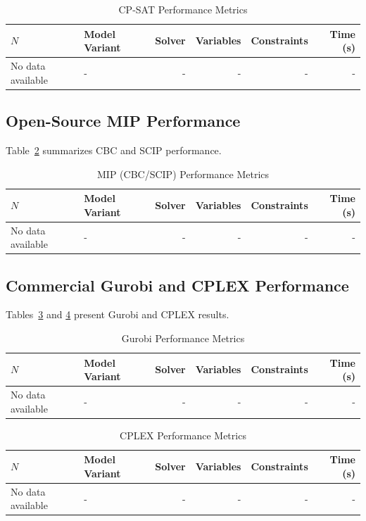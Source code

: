 \documentclass[a4paper,fleqn]{cas-sc}
\begin{document}
\begin{table}[H]
\centering
\caption{CP-SAT Performance Metrics} \label{tab:cpsat}
\begin{tabular}{llrrrr}
\toprule
$N$ & Model Variant & Solver & Variables & Constraints & Time (s) \\
\midrule
No data available & - & - & - & - & - \\
\bottomrule
\end{tabular}
\end{table}

\subsection{Open-Source MIP Performance}
Table~\ref{tab:mip} summarizes CBC and SCIP performance.

\begin{table}[H]
\centering
\caption{MIP (CBC/SCIP) Performance Metrics} \label{tab:mip}
\begin{tabular}{llrrrr}
\toprule
$N$ & Model Variant & Solver & Variables & Constraints & Time (s) \\
\midrule
No data available & - & - & - & - & - \\
\bottomrule
\end{tabular}
\end{table}

\subsection{Commercial Gurobi and CPLEX Performance}
Tables~\ref{tab:gurobi} and \ref{tab:cplex} present Gurobi and CPLEX results.

\begin{table}[H]
\centering
\caption{Gurobi Performance Metrics} \label{tab:gurobi}
\begin{tabular}{llrrrr}
\toprule
$N$ & Model Variant & Solver & Variables & Constraints & Time (s) \\
\midrule
No data available & - & - & - & - & - \\
\bottomrule
\end{tabular}
\end{table}

\begin{table}[H]
\centering
\caption{CPLEX Performance Metrics} \label{tab:cplex}
\begin{tabular}{llrrrr}
\toprule
$N$ & Model Variant & Solver & Variables & Constraints & Time (s) \\
\midrule
No data available & - & - & - & - & - \\
\bottomrule
\end{tabular}
\end{table}
\end{document}
